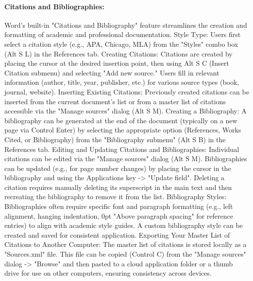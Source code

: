 \paragraph{Citations and Bibliographies:}
Word's built-in "Citations and Bibliography" feature streamlines the creation and formatting of academic and professional documentation.\supercite{kingsbury2025}
Style Type: Users first select a citation style (e.g., APA, Chicago, MLA) from the "Styles" combo box (Alt S L) in the References tab.\supercite{kingsbury2025}
Creating Citations: Citations are created by placing the cursor at the desired insertion point, then using Alt S C (Insert Citation submenu) and selecting "Add new source." Users fill in relevant information (author, title, year, publisher, etc.) for various source types (book, journal, website).\supercite{kingsbury2025}
Inserting Existing Citations: Previously created citations can be inserted from the current document's list or from a master list of citations accessible via the "Manage sources" dialog (Alt S M).\supercite{kingsbury2025}
Creating a Bibliography: A bibliography can be generated at the end of the document (typically on a new page via Control Enter) by selecting the appropriate option (References, Works Cited, or Bibliography) from the "Bibliography submenu" (Alt S B) in the References tab.\supercite{kingsbury2025}
Editing and Updating Citations and Bibliographies: Individual citations can be edited via the "Manage sources" dialog (Alt S M).\supercite{kingsbury2025} Bibliographies can be updated (e.g., for page number changes) by placing the cursor in the bibliography and using the Applications key -\textgreater{} "Update field".\supercite{kingsbury2025} Deleting a citation requires manually deleting its superscript in the main text and then recreating the bibliography to remove it from the list.\supercite{kingsbury2025}
Bibliography Styles: Bibliographies often require specific font and paragraph formatting (e.g., left alignment, hanging indentation, 0pt "Above paragraph spacing" for reference entries) to align with academic style guides.\supercite{kingsbury2025} A custom bibliography style can be created and saved for consistent application.\supercite{kingsbury2025}
Exporting Your Master List of Citations to Another Computer: The master list of citations is stored locally as a "Sources.xml" file. This file can be copied (Control C) from the "Manage sources" dialog -\textgreater{} "Browse" and then pasted to a cloud application folder or a thumb drive for use on other computers, ensuring consistency across devices.\supercite{kingsbury2025}
